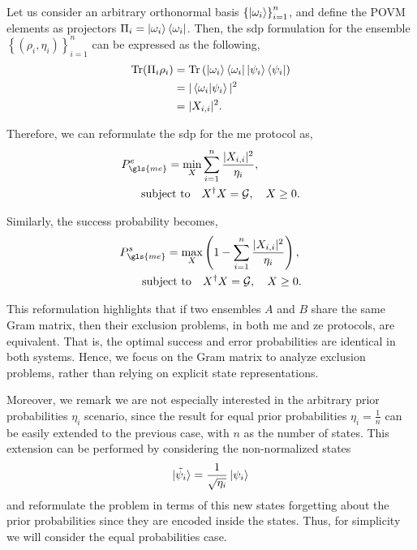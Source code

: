 \documentclass[12pt,letterpaper]{article}
\DeclareMathOperator{\tr}{Tr}
\begin{document}
\begin{multicols}{2}
Let us consider an arbitrary orthonormal basis $\left\{\ket{\omega_i}\right\}_{i=1}^n$, and define the POVM elements as projectors $\Pi_i = \ket{\omega_i}\bra{\omega_i}$. Then, the \gls{sdp} formulation for the ensemble $\left\{(\rho_i,\eta_i)\right\}_{i=1}^n$ can be expressed as the following,
\begin{align*}
	\tr(\Pi_i \rho_i) &= \tr\left( \ket{\omega_i}\bra{\omega_i} \ket{\psi_i}\bra{\psi_i} \right) \\
	&= |\braket{\omega_i|\psi_i}|^2 \\
	&= |X_{i,i}|^2.
\end{align*}

Therefore, we can reformulate the \gls{sdp} for the \gls{me} protocol as,
\begin{align*}
	P_{\gls{me}}^e = \min_{X} &\sum_{i=1}^n \frac{|X_{i,i}|^2}{\eta_i},\\
	\text{subject to} \quad & X^\dagger X = \mathcal{G}, \quad X \geq 0.
\end{align*}

Similarly, the success probability becomes, 
\begin{align*}
	P_{\gls{me}}^s = \max_{X} &\left(1 - \sum_{i=1}^n \frac{|X_{i,i}|^2}{\eta_i}\right),\\
	\text{subject to} \quad & X^\dagger X = \mathcal{G}, \quad X \geq 0.
\end{align*}

This reformulation highlights that if two ensembles $A$ and $B$ share the same Gram matrix, then their exclusion problems, in both \gls{me} and \gls{ze} protocols, are equivalent. That is, the optimal success and error probabilities are identical in both systems. Hence, we focus on the Gram matrix to analyze exclusion problems, rather than relying on explicit state representations.

Moreover, we remark we are not especially interested in the arbitrary prior probabilities $\eta_i$ scenario, since the result for equal prior probabilities $\eta_i=\frac{1}{n}$ can be easily extended to the previous case, with $n$ as the number of states. This extension can be performed by considering the non-normalized states
\begin{align*}
	\ket{\tilde{\psi_i}}=\frac{1}{\sqrt{\eta_i}}\ket{\psi_i}
\end{align*}
and reformulate the problem in terms of this new states forgetting about the prior probabilities since they are encoded inside the states. Thus, for simplicity we will consider the equal probabilities case.


\end{multicols}
\end{document}
